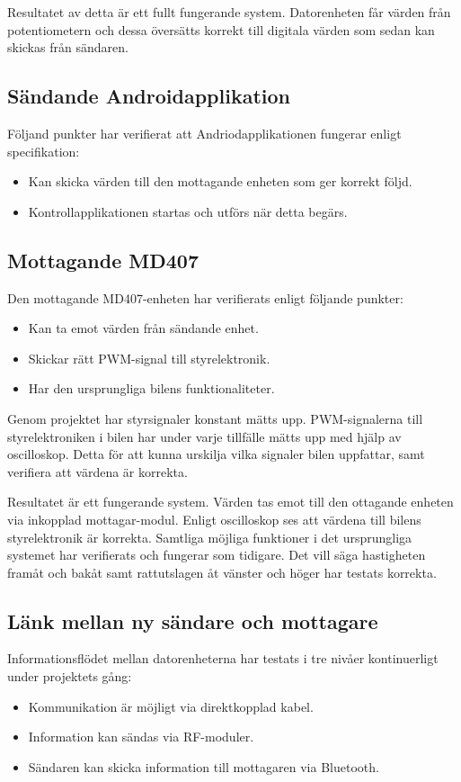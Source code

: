 \documentclass[a4paper]{article}
\begin{document}
\noindent
Resultatet av detta är ett fullt fungerande system. Datorenheten får värden från potentiometern och dessa översätts korrekt till digitala värden som sedan kan skickas från sändaren.


\subsection{Sändande Androidapplikation}
Följand punkter har verifierat att Andriodapplikationen fungerar enligt specifikation:

\begin{itemize}
\item Kan skicka värden till den mottagande enheten som ger korrekt följd.
\item Kontrollapplikationen startas och utförs när detta begärs.
\end{itemize}




\subsection{Mottagande MD407}
Den mottagande MD407-enheten har verifierats enligt följande punkter:

\begin{itemize}
\item Kan ta emot värden från sändande enhet.
\item Skickar rätt PWM-signal till styrelektronik.
\item Har den ursprungliga bilens funktionaliteter.
\end{itemize}

\noindent
Genom projektet har styrsignaler konstant mätts upp. PWM-signalerna till styrelektroniken i bilen har under varje tillfälle mätts upp med hjälp av oscilloskop. Detta för att kunna urskilja vilka signaler bilen uppfattar, samt verifiera att värdena är korrekta.

\vspace{5mm} \noindent
Resultatet är ett fungerande system. Värden tas emot till den ottagande enheten via inkopplad mottagar-modul. Enligt oscilloskop ses att värdena till bilens styrelektronik är korrekta. Samtliga möjliga funktioner i det ursprungliga systemet har verifierats och fungerar som tidigare. Det vill säga hastigheten framåt och bakåt samt rattutslagen åt vänster och höger har testats korrekta.


\subsection{Länk mellan ny sändare och mottagare}
Informationsflödet mellan datorenheterna har testats i tre nivåer kontinuerligt under projektets gång:
\begin{itemize}
\item Kommunikation är möjligt via direktkopplad kabel.
\item Information kan sändas via RF-moduler.
\item Sändaren kan skicka information till mottagaren via Bluetooth.
\end{itemize}
\end{document}
